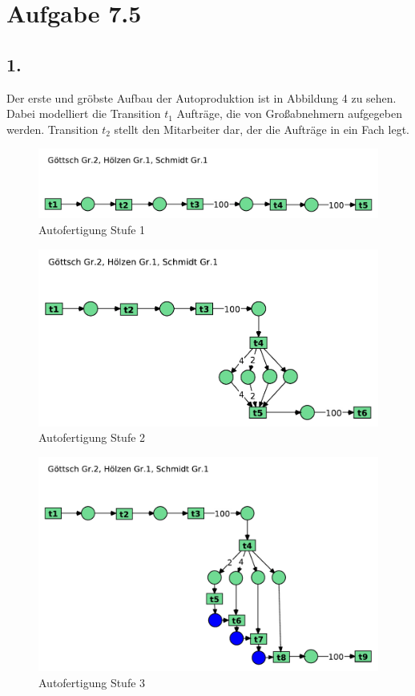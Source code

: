 \documentclass[12pt, paper=a4]{article}
\begin{document}
\newpage
\section*{Aufgabe 7.5}
\subsection*{1.}
Der erste und gröbste Aufbau der Autoproduktion ist in Abbildung 4 zu sehen. Dabei modelliert die Transition $t_1$ Aufträge, die von Großabnehmern aufgegeben werden. Transition $t_2$ stellt den Mitarbeiter dar, der die Aufträge in ein Fach legt.

\begin{figure}[h!]
\centering
\includegraphics[scale=0.7]{7-5-1.pdf}
\caption{Autofertigung Stufe 1}
\end{figure}

\begin{figure}[h!]
\centering
\includegraphics[scale=0.7]{7-5-2.pdf}
\caption{Autofertigung Stufe 2}
\end{figure}

\begin{figure}[h!]
\centering
\includegraphics[scale=0.7]{7-5-3.pdf}
\caption{Autofertigung Stufe 3}
\end{figure}
\end{document}

